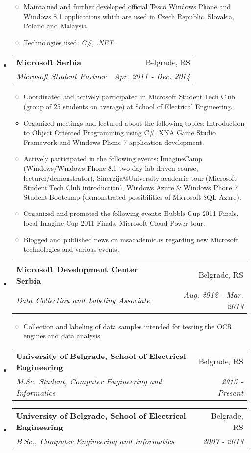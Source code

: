 \documentclass[letterpaper,11pt]{article}
\makeatletter
\newcommand{\resitem}[1]{\item #1 \vspace{-2pt}}
\newcommand{\resheading}[1]{{\large \parashade[.9]{sharpcorners}{\textbf{#1 \vphantom{p\^{E}}}}}}
\newcommand{\ressubheading}[4]{
\begin{tabular*}{6.5in}{l@{\extracolsep{\fill}}r}
		\textbf{#1} & #2 \\
		\textit{#3} & \textit{#4} \\
\end{tabular*}\vspace{-6pt}}
\makeatother
\begin{document}
\begin{itemize}
\begin{itemize}
		\vspace{1mm}
		\resitem{Maintained and further developed official Tesco Windows Phone and Windows 8.1 applications which are used in Czech Republic, Slovakia, Poland and Malaysia.}
		\vspace{1mm}
		\resitem{Technologies used: \textit{C\#, .NET.}}
		\vspace{1mm}
\end{itemize}
\item
	\ressubheading{Microsoft Serbia}{Belgrade, RS}{Microsoft Student Partner}{Apr. 2011 - Dec. 2014}
	\vspace{2mm}
	\begin{itemize}
		\resitem{Coordinated and actively participated in Microsoft Student Tech Club (group of 25 students on average) at School of Electrical Engineering.}
		\vspace{1mm}
		\resitem{Organized meetings and lectured about the following topics: Introduction to Object Oriented Programming using C\#, XNA Game Studio Framework and Windows Phone 7 application development.}
		\vspace{1mm}
		\resitem{Actively participated in the following events: ImagineCamp (Windows/Windows Phone 8.1 two-day lab-driven course, lecturer/demonstrator), Sinergija@University academic tour (Microsoft Student Tech Club introduction), Windows Azure \& Windows Phone 7 Student Bootcamp (demonstrated possibilities of Microsoft SQL Azure).}
		\vspace{1mm}
		\resitem{Organized and promoted the following events: Bubble Cup 2011 Finals, local Imagine Cup 2011 Finals, Microsoft Cloud Power tour.}
		\vspace{1mm}
		\resitem{Blogged and published news on msacademic.rs regarding new Microsoft technologies and various events.}
		\vspace{1mm}
	\end{itemize}

\item
	\ressubheading{Microsoft Development Center Serbia}{Belgrade, RS}{Data Collection and Labeling Associate}{Aug. 2012 - Mar. 2013}
	\vspace{2mm}
	\begin{itemize}
		\resitem{ Collection and labeling of data samples intended for testing the OCR engines and data analysis.}
		\vspace{1mm}
	\end{itemize}
\end{itemize}
\resheading{Education}
\begin{itemize}
\item
	\ressubheading{University of Belgrade, School of Electrical Engineering}{Belgrade, RS}{M.Sc. Student, Computer Engineering and Informatics}{2015 - Present}
\item
	\ressubheading{University of Belgrade, School of Electrical Engineering}{Belgrade, RS}{B.Sc., Computer Engineering and Informatics}{2007 - 2013}

\end{itemize}
\end{document}

